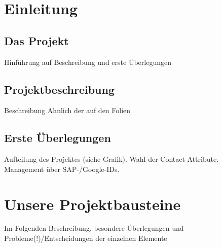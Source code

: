 \section{Einleitung}
\subsection{Das Projekt}
Hinführung auf Beschreibung und erste Überlegungen

\subsection{Projektbeschreibung}
Beschreibung Ahnlich der auf den Folien

\subsection{Erste Überlegungen}
Aufteilung des Projektes (siehe Grafik). Wahl der Contact-Attribute. Management über SAP-/Google-IDs.



\section{Unsere Projektbausteine}
Im Folgenden Beschreibung, besondere Überlegungen und Probleme(!)/Entscheidungen der einzelnen Elemente

